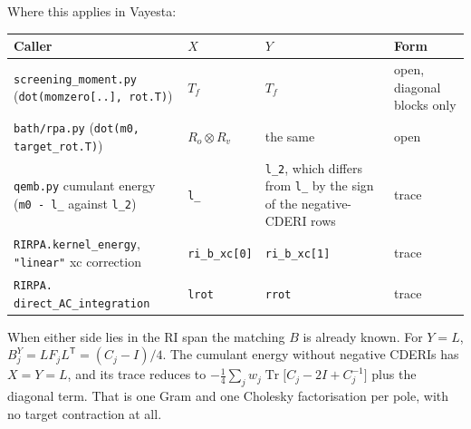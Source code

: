 \documentclass[11pt,a4paper]{article}
\newcommand{\code}[1]{\texttt{\small #1}}
\newcommand{\Tr}{\operatorname{Tr}}
\begin{document}
\begin{enumerate}
        Where this applies in Vayesta:
        \begin{center}
        \footnotesize
        \begin{tabularx}{\linewidth}{@{}>{\raggedright\arraybackslash}p{3.9cm}>{\raggedright\arraybackslash}p{2.0cm}L>{\raggedright\arraybackslash}p{1.6cm}@{}}
        \toprule
        Caller & $X$ & $Y$ & Form \\
        \midrule
        \code{screening\_moment.py} (\code{dot(momzero[..], rot.T)}) & $T_f$ & $T_f$
          & open, diagonal blocks only \\
        \code{bath/rpa.py} (\code{dot(m0, target\_rot.T)}) & $R_o\otimes R_v$ & the same & open \\
        \code{qemb.py} cumulant energy (\code{m0 - l\_} against \code{l\_2})
          & \code{l\_} & \code{l\_2}, which differs from \code{l\_} by the sign of the negative-CDERI rows & trace \\
        \code{RIRPA.kernel\_energy}, \code{"linear"} xc correction
          & \code{ri\_b\_xc[0]} & \code{ri\_b\_xc[1]} & trace \\
        \code{RIRPA.} \code{direct\_AC\_integration} & \code{lrot} & \code{rrot} & trace \\
        \bottomrule
        \end{tabularx}
        \end{center}

        When either side lies in the RI span the matching $B$ is already known. For $Y=L$,
        $B_j^Y = LF_jL^{\mathsf T} = (C_j-I)/4$. The cumulant energy without negative CDERIs
        has $X=Y=L$, and its trace reduces to
        $-\tfrac14\sum_j w_j\Tr\big[C_j - 2I + C_j^{-1}\big]$ plus the diagonal term. That is
        one Gram and one Cholesky factorisation per pole, with no target contraction at all.


\end{enumerate}
\end{document}
